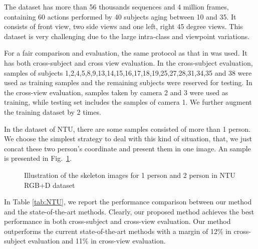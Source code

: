 \documentclass[10pt,journal]{IEEEtran}
\begin{document}
The dataset has more than 56 thousands sequences and 4 million frames, containing 60 actions performed by 40 subjects aging between 10 and 35. It consists of front view, two side views and one left, right 45 degree views. This dataset is very challenging due to the large intra-class and viewpoint variations.

For a fair comparison and evaluation, the same protocol as that in \cite{Shahroudy2016NTU} was used. It has both cross-subject and cross view evaluation. In the cross-subject evaluation, samples of subjects 1,2,4,5,8,9,13,14,15,16,17,18,19,25,27,28,31,34,35 and 38 were used as training samples and the remaining subjects were reserved for testing. In the cross-view evaluation, samples taken by camera 2 and 3 were used as training, while testing set includes the samples of camera 1. We further augment the training dataset by 2 times. 

In the dataset of NTU, there are some samples consisted of more than 1 person. We choose the simplest strategy to deal with this kind of situation, that, we just concat these two person's coordinate and present them in one image. An sample is presented in Fig.~\ref{fig:NTUmap}.

\begin{figure}[htb]
\centering
{}
\caption{Illustration of the skeleton images for 1 person and 2 person in NTU RGB+D dataset}
\label{fig:NTUmap}
\end{figure}


In Table \ref{tab:NTU}, we report the performance comparison between our method and the state-of-the-art methods. Clearly, our proposed method achieves the best performance in both cross-subject and cross-view evaluation. Our method outperforms the current state-of-the-art methods with a margin of 12\% in cross-subject evaluation and 11\% in cross-view evaluation.
\end{document}
